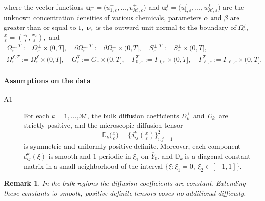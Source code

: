 \documentclass[reqno]{amsart}            %
\newtheorem{remark}{Remark}[section]
\numberwithin{equation}{section}
\begin{document}
	where the vector-functions $\mathbf{u}^\pm_\varepsilon = \big(u^\pm_{1,\varepsilon},\ldots,u^\pm_{\mathcal{M},\varepsilon}\big)$ and
	$\mathbf{u}^f_\varepsilon = \big(u^f_{1,\varepsilon},\ldots,u^f_{\mathcal{M},\varepsilon}\big)$ are the unknown concentration densities of various chemicals, parameters $\alpha$  and $\beta$ are greater than or equal to $1,$  $\boldsymbol{\nu}_\varepsilon$ is the outward unit normal to the boundary of $\Omega^f_\varepsilon,$ $\frac{x}{\varepsilon} =(\frac{x_1}{\varepsilon}, \frac{x_2}{\varepsilon}),$ and 
	\begin{gather*}
		\Omega^{\pm, T}_\varepsilon := \Omega^\pm_\varepsilon \times (0, T],\quad 
		\partial\Omega^{\pm, T}_\varepsilon := \partial\Omega^\pm_\varepsilon \times (0, T], \quad
		S^{\pm, T}_\varepsilon := S^\pm_\varepsilon \times (0, T],
		\\
		\Omega^{f, T}_\varepsilon := \Omega^{f}_\varepsilon \times (0, T],\quad
		G_\varepsilon^T := G_\varepsilon \times (0, T], \quad \Gamma^T_{0,\varepsilon} := \Gamma_{0,\varepsilon}\times (0, T], \quad 
		\Gamma^T_{\ell,\varepsilon} := \Gamma_{\ell,\varepsilon}\times (0, T].
	\end{gather*}
		
	\paragraph*{{\bf Assumptions on the data}}
	\begin{description}
		\item[A1] 
		For each \(k = 1,\dots,\mathcal{M}\), the bulk diffusion coefficients \(D_k^+\) and \(D_k^-\) are strictly positive, and the microscopic diffusion tensor
		\[
		\mathbb{D}_k\!\bigl(\tfrac{x}{\varepsilon}\bigr)
		= \bigl\{d^k_{ij}(\tfrac{x}{\varepsilon})\bigr\}_{i,j=1}^2
		\]
		is symmetric and uniformly positive definite.  Moreover, each component \(d^k_{ij}(\xi)\) is smooth and \(1\)-periodic in $\xi_1$  on \(\overline{Y}_0\), and $\mathbb{D}_k$ is a diagonal constant matrix in a small neighborhood of the interval $\{\xi\colon \xi_1 =0, \ \xi_2 \in [-1,1]\}.$
	\end{description}
	
	\begin{remark}
		In the bulk regions the diffusion coefficients are constant.  Extending these constants to smooth, positive-definite tensors poses no additional difficulty.
	\end{remark}
	
\end{document}
